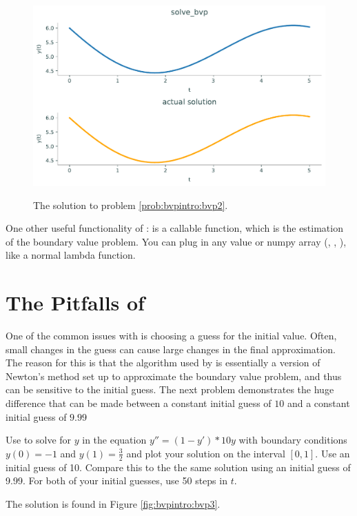 \begin{figure}[H]
\label{fig:bvpintro:bvp2}
    \centering
    \includegraphics[height=3in]{figures/problem2.pdf}
    \caption{The solution to problem \ref{prob:bvpintro:bvp2}.}
\end{figure}

One other useful functionality of :  is a callable function, which is the estimation of the boundary value problem.
You can plug in any value or numpy array (, , ), like a normal lambda function.

\section*{The Pitfalls of }
One of the common issues with  is choosing a guess for the initial value.
Often, small changes in the guess can cause large changes in the final approximation.
The reason for this is that the algorithm used by  is essentially a version of Newton's method set up to approximate the boundary value problem, and thus can be sensitive to the initial guess.
The next problem demonstrates the huge difference that can be made between a constant initial guess of $10$ and a constant initial guess of $9.99$

\begin{problem}
    \label{prob:bvpintro:bvp3}
    Use  to solve for $y$ in the equation $y''=(1-y')*10y$ with boundary conditions $y(0)=-1$ and $y(1)=\frac{3}{2}$ and plot your solution on the interval $[0,1]$. Use an initial guess of 10.
    Compare this to the the same solution using an initial guess of 9.99.
    For both of your initial guesses, use 50 steps in \(t\).

    The solution is found in Figure \ref{fig:bvpintro:bvp3}.
\end{problem}

